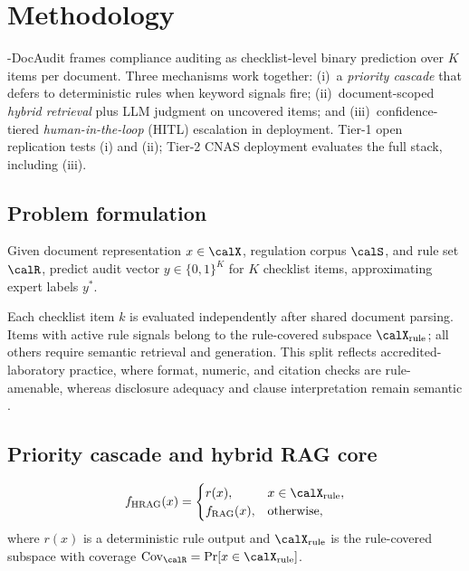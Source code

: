 \section{Methodology}
\label{sec:method}

\HRAG{}-DocAudit frames compliance auditing as checklist-level binary prediction over $K$ items per document. Three mechanisms work together: (i)~a \emph{priority cascade} that defers to deterministic rules when keyword signals fire; (ii)~document-scoped \emph{hybrid retrieval} plus LLM judgment on uncovered items; and (iii)~confidence-tiered \emph{human-in-the-loop} (HITL) escalation in deployment. Tier-1 open replication tests (i) and (ii); Tier-2 CNAS deployment evaluates the full stack, including (iii).

\subsection{Problem formulation}

\begin{definition}
Given document representation $x \in \calX$, regulation corpus $\calS$, and rule set $\calR$, predict audit vector $y \in \{0,1\}^K$ for $K$ checklist items, approximating expert labels $y^*$.
\end{definition}

Each checklist item $k$ is evaluated independently after shared document parsing. Items with active rule signals belong to the rule-covered subspace $\calX_{\mathrm{rule}}$; all others require semantic retrieval and generation. This split reflects accredited-laboratory practice, where format, numeric, and citation checks are rule-amenable, whereas disclosure adequacy and clause interpretation remain semantic \cite{solihin2015rules,zhang2016acc}.

\subsection{Priority cascade and hybrid RAG core}

\begin{definition}
\begin{equation}
f_{\mathrm{HRAG}}(x)=
\begin{cases}
r(x), & x \in \calX_{\mathrm{rule}},\\
f_{\mathrm{RAG}}(x), & \text{otherwise},
\end{cases}
\end{equation}
where $r(x)$ is a deterministic rule output and $\calX_{\mathrm{rule}}$ is the rule-covered subspace with coverage $\mathrm{Cov}_{\calR}=\Pr[x\in\calX_{\mathrm{rule}}]$.
\end{definition}

